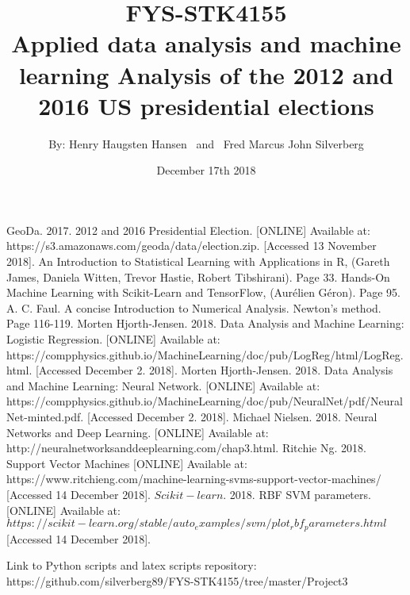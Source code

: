 \documentclass[a4paper,10pt]{article}
\begin{document}
   \title{FYS-STK4155\\ Applied data analysis and machine learning \newline \newline \large Analysis of the 2012 and 2016 US presidential elections}
   \par
   \author{By: Henry Haugsten Hansen \  and \  Fred Marcus John Silverberg}
          
   \date{December 17th 2018}

   \maketitle

   \newpage
   \tableofcontents


   \newpage

   \newpage




\newpage
\begin{thebibliography}{1}
     GeoDa. 2017. 2012 and 2016 Presidential Election. [ONLINE] Available at: https://s3.amazonaws.com/geoda/data/election.zip. [Accessed 13 November 2018].
     An Introduction to Statistical Learning with Applications in R, (Gareth James, Daniela Witten, Trevor Hastie, Robert Tibshirani). Page 33.
     Hands-On Machine Learning with Scikit-Learn and TensorFlow, (Aurélien Géron). Page 95.
     A. C. Faul. A concise Introduction to Numerical Analysis. Newton's method. Page 116-119. 
     Morten Hjorth-Jensen. 2018. Data Analysis and Machine  Learning: Logistic Regression. [ONLINE] Available at: https://compphysics.github.io/MachineLearning/doc/pub/LogReg/html/LogReg.html. [Accessed December 2. 2018].    
     Morten Hjorth-Jensen. 2018. Data Analysis and Machine  Learning: Neural Network. [ONLINE] Available at: https://compphysics.github.io/MachineLearning/doc/pub/NeuralNet/pdf/NeuralNet-minted.pdf. [Accessed December 2. 2018].
     Michael Nielsen. 2018. Neural Networks and Deep Learning. [ONLINE] Available at: http://neuralnetworksanddeeplearning.com/chap3.html.
     Ritchie Ng. 2018. Support Vector Machines [ONLINE] Available at: https://www.ritchieng.com/machine-learning-svms-support-vector-machines/ [Accessed 14 December 2018].
     $Scikit-learn$. 2018. RBF SVM parameters. [ONLINE] Available at: $https://scikit-learn.org/stable/auto_examples/svm/plot_rbf_parameters.html$ [Accessed 14 December 2018].
   
\end{thebibliography}

Link to Python scripts and latex scripts repository:\\
https://github.com/silverberg89/FYS-STK4155/tree/master/Project3
\end{document}
